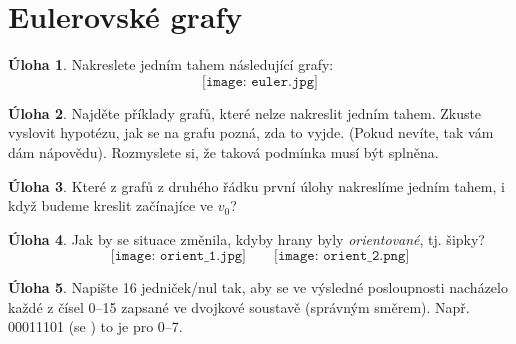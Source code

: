 \documentclass[12pt,a5paper]{article}
\def\tisk{%
\newbox\shipouthackbox
\pdfpagewidth=2\pdfpagewidth
\let\oldshipout=\shipout
\def\shipout{\afterassignment\zdvojtmp \setbox\shipouthackbox=}%
\def\zdvojtmp{\aftergroup\zdvoj}%
\def\zdvoj{%
    \oldshipout\vbox{\hbox{%
        \copy\shipouthackbox
        \hskip\dimexpr .5\pdfpagewidth-\wd\shipouthackbox\relax
        \box\shipouthackbox
    }}%
}}%
\theoremstyle{definition}
\newtheorem{uloha}{Úloha}
\begin{document}

\section*{Eulerovské grafy}

\begin{uloha}
Nakreslete jedním tahem následující grafy:
\[\texttt{[image: euler.jpg]}\]
\end{uloha}

\begin{uloha}
Najděte příklady grafů, které nelze nakreslit jedním tahem. Zkuste vyslovit hypotézu, jak se na grafu pozná, zda to vyjde. (Pokud nevíte, tak vám dám nápovědu). Rozmyslete si, že taková podmínka musí být splněna.
\end{uloha}

\begin{uloha}
Které z grafů z druhého řádku první úlohy nakreslíme jedním tahem, i když budeme kreslit  začínajíce ve $v_0$?
\end{uloha}

\begin{uloha}
Jak by se situace změnila, kdyby hrany byly \emph{orientované}, tj. šipky?
\[ \texttt{[image: orient\_1.jpg]}\qquad\texttt{[image: orient\_2.png]} \]
\end{uloha}

\begin{uloha}
Napište 16 jedniček/nul  tak, aby se ve výsledné posloupnosti nacházelo každé z čísel 0--15 zapsané ve dvojkové soustavě (správným směrem). Např. 00011101 (se ) to je pro 0--7.
\end{uloha}
\end{document}
